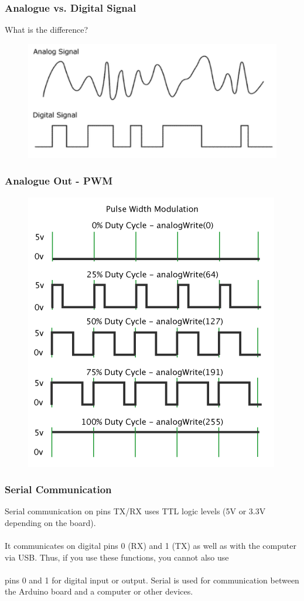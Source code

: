 \begin{frame}
	\frametitle{Analogue vs. Digital Signal}
	What is the difference? 
	
	\pause
	 \begin{figure}
		\includegraphics[scale=.25]{assets/dva} 

	\end{figure}
\end{frame}

\begin{frame}
	\frametitle{Analogue Out - PWM}
	\begin{figure}
   		\includegraphics[scale=.4]{assets/pwm} 
	\end{figure}
\end{frame}

\begin{frame}
	\frametitle{Serial Communication}
	Serial communication on pins TX/RX uses TTL logic levels (5V or 3.3V depending on the board). \\~\\
	It communicates on digital pins 0 (RX) and 1 (TX) as well as with the computer via USB. Thus, if you use these functions, you cannot also use \\~\\pins 0 and 1 for digital input or output. 
	Serial is used for communication between the Arduino board and a computer or other devices. 
	
\end{frame}

